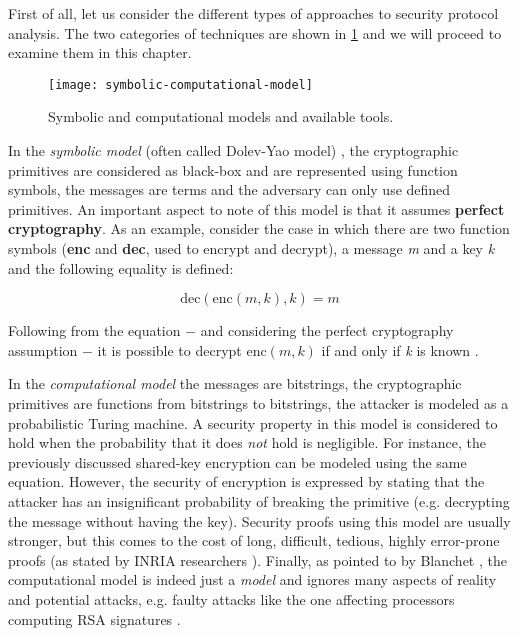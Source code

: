 First of all, let us consider the different types of approaches to security protocol analysis. The two categories of techniques are shown in \cref{fig:symbolic-computational-model} and we will proceed to examine them in this chapter.

\begin{figure}[t]
    \texttt{[image: symbolic-computational-model]}
    \centering
    \caption{Symbolic and computational models and available tools.}
    \label{fig:symbolic-computational-model}
\end{figure}

In the \textit{symbolic model} (often called Dolev-Yao model) \cite{Dolev-Yao}, the cryptographic primitives are considered as black-box and are represented using function symbols, the messages are terms and the adversary can only use defined primitives. An important aspect to note of this model is that it assumes \textbf{perfect cryptography}. As an example, consider the case in which there are two function symbols (\textbf{enc} and \textbf{dec}, used to encrypt and decrypt), a message \textit{m} and a key \textit{k} and the following equality is defined:

\begin{equation}
\mbox{dec}\left(\mbox{enc}\left(m, k\right), k\right) = m
\end{equation}

Following from the equation $-$ and considering the perfect cryptography assumption $-$ it is possible to decrypt $\mbox{enc}\left(m, k\right)$ if and only if \textit{k} is known \cite{SymbolicComputationalBlanchet}.

In the \textit{computational model} the messages are bitstrings, the cryptographic primitives are functions from bitstrings to bitstrings, the attacker is modeled as a probabilistic Turing machine.
A security property in this model is considered to hold when the probability that it does \textit{not} hold is negligible. For instance, the previously discussed shared-key encryption can be modeled using the same equation. However, the security of encryption is expressed by stating that the attacker has an insignificant probability of breaking the primitive (e.g. decrypting the message without having the key). Security proofs using this model are usually stronger, but this comes to the cost of long, difficult, tedious, highly error-prone proofs (as stated by INRIA researchers \cite{ComputationalAnalysisCryptoSystemsINRIA}). Finally, as pointed to by Blanchet \cite{SymbolicComputationalBlanchet}, the computational model is indeed just a \textit{model} and ignores many aspects of reality and potential attacks, e.g. faulty attacks like the one affecting processors computing RSA signatures \cite{RSAFaultAttack}. 

